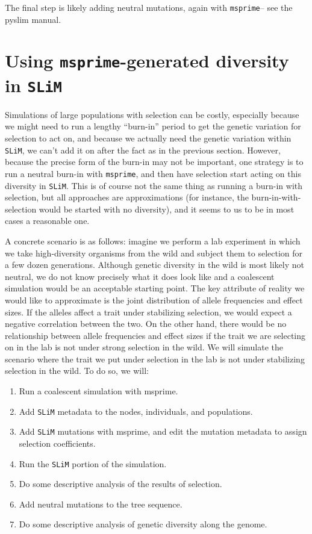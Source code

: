 \documentclass[12pt]{article}
\newcommand{\msprime}[0]{\texttt{msprime}\xspace}
\newcommand{\slim}[0]{\texttt{SLiM}\xspace}
\begin{document}
The final step is likely adding neutral mutations,
again with \msprime -- see the pyslim manual.


\section{Using \msprime-generated diversity in \slim}

Simulations of large populations with selection can be costly,
especially because we might need to run a lengthy ``burn-in'' period
to get the genetic variation for selection to act on,
and because we actually need the genetic variation within \slim,
we can't add it on after the fact as in the previous section.
However, because the precise form of the burn-in may not be important, 
one strategy is to run a neutral burn-in with \msprime,
and then have selection start acting on this diversity in \slim.
This is of course not the same thing as running a burn-in with selection,
but all approaches are approximations
(for instance, the burn-in-with-selection would be started with no diversity),
and it seems to us to be in most cases a reasonable one.

A concrete scenario is as follows:
imagine we perform a lab experiment in which
we take high-diversity organisms from the wild
and subject them to selection for a few dozen generations.
Although genetic diversity in the wild is most likely not neutral,
we do not know precisely what it does look like
and a coalescent simulation would be an acceptable starting point.
The key attribute of reality we would like to approximate
is the joint distribution of allele frequencies and effect sizes.
If the alleles affect a trait under stabilizing selection,
we would expect a negative correlation between the two.
On the other hand, there would be no relationship between allele frequencies and effect sizes
if the trait we are selecting on in the lab is not under strong selection in the wild.
We will simulate the scenario where the trait we put under selection in the lab
is not under stabilizing selection in the wild.
To do so, we will:
\begin{enumerate}
    \item Run a coalescent simulation with msprime.
    \item Add \slim metadata to the nodes, individuals, and populations.
    \item Add \slim mutations with msprime,
        and edit the mutation metadata to assign selection coefficients.
    \item Run the \slim portion of the simulation.
    \item Do some descriptive analysis of the results of selection.
    \item Add neutral mutations to the tree sequence.
    \item Do some descriptive analysis of genetic diversity along the genome.
\end{enumerate}
\end{document}
